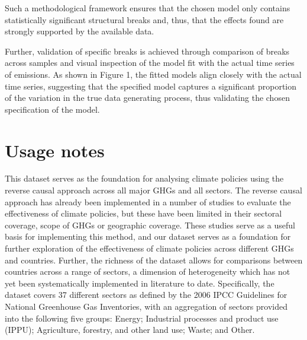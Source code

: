 \documentclass[a4paper]{article}
\begin{document}
Such a methodological framework ensures that the chosen model only contains statistically significant structural breaks and, thus, that the effects found are strongly supported by the available data.

Further, validation of specific breaks is achieved through comparison of breaks across samples and visual inspection of the model fit with the actual time series of emissions. As shown in Figure 1, the fitted models align closely with the actual time series, suggesting that the specified model captures a significant proportion of the variation in the true data generating process, thus validating the chosen specification of the model.


\section*{Usage notes}

This dataset serves as the foundation for analysing climate policies using the reverse causal approach across all major GHGs and all sectors. The reverse causal approach has already been implemented in a number of studies to evaluate the effectiveness of climate policies, but these have been limited in their sectoral coverage, scope of GHGs or geographic coverage. \cite{stechemesser2024climate,tebecis2023climate,koch2022attributing, yao2022structural} These studies serve as a useful basis for implementing this method, and our dataset serves as a foundation for further exploration of the effectiveness of climate policies across different GHGs and countries. Further, the richness of the dataset allows for comparisons between countries across a range of sectors, a dimension of heterogeneity which has not yet been systematically implemented in literature to date. Specifically, the dataset covers 37 different sectors as defined by the 2006 IPCC Guidelines for National Greenhouse Gas Inventories, with an aggregation of sectors provided into the following five groups: Energy; Industrial processes and product use (IPPU); Agriculture, forestry, and other land use; Waste; and Other.
\end{document}
